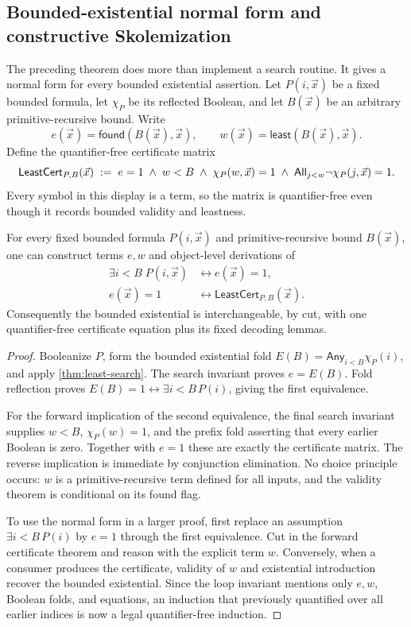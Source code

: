 \subsection{Bounded-existential normal form and constructive Skolemization}

The preceding theorem does more than implement a search routine.  It gives a normal form for every bounded existential assertion.  Let \(P(i,\vec x)\) be a fixed bounded formula, let \(\chi_P\) be its reflected Boolean, and let \(B(\vec x)\) be an arbitrary primitive-recursive bound.  Write
\[
  e(\vec x)=\mathsf{found}(B(\vec x),\vec x),
  \qquad
  w(\vec x)=\mathsf{least}(B(\vec x),\vec x).
\]
Define the quantifier-free certificate matrix
\[
 \mathsf{LeastCert}_{P,B}(\vec x) \;\mathrel{:=}\;
 e=1\;\wedge\;w<B\;\wedge\;\chi_P(w,\vec x)=1
 \;\wedge\;\mathsf{All}_{j<w}\neg\chi_P(j,\vec x)=1.
\]
Every symbol in this display is a term, so the matrix is quantifier-free even though it records bounded validity and leastness.

\begin{theorem}\label{thm:bounded-ex-normal}
For every fixed bounded formula \(P(i,\vec x)\) and primitive-recursive bound \(B(\vec x)\), one can construct terms \(e,w\) and object-level derivations of
\begin{align*}
 \exists i<B\;P(i,\vec x)
   &\leftrightarrow e(\vec x)=1,\\
 e(\vec x)=1
   &\leftrightarrow \mathsf{LeastCert}_{P,B}(\vec x).
\end{align*}
Consequently the bounded existential is interchangeable, by cut, with one quantifier-free certificate equation plus its fixed decoding lemmas.
\end{theorem}

\begin{proof}
Booleanize \(P\), form the bounded existential fold \(E(B)=\mathsf{Any}_{i<B}\chi_P(i)\), and apply \cref{thm:least-search}.  The search invariant proves \(e=E(B)\).  Fold reflection proves
\(E(B)=1\leftrightarrow\exists i<B\,P(i)\), giving the first equivalence.

For the forward implication of the second equivalence, the final search invariant supplies \(w<B\), \(\chi_P(w)=1\), and the prefix fold asserting that every earlier Boolean is zero.  Together with \(e=1\) these are exactly the certificate matrix.  The reverse implication is immediate by conjunction elimination.  No choice principle occurs: \(w\) is a primitive-recursive term defined for all inputs, and the validity theorem is conditional on its found flag.

To use the normal form in a larger proof, first replace an assumption
\(\exists i<B\,P(i)\) by \(e=1\) through the first equivalence.  Cut in the forward certificate theorem and reason with the explicit term \(w\).  Conversely, when a consumer produces the certificate, validity of \(w\) and existential introduction recover the bounded existential.  Since the loop invariant mentions only \(e,w\), Boolean folds, and equations, an induction that previously quantified over all earlier indices is now a legal quantifier-free induction.
\end{proof}

